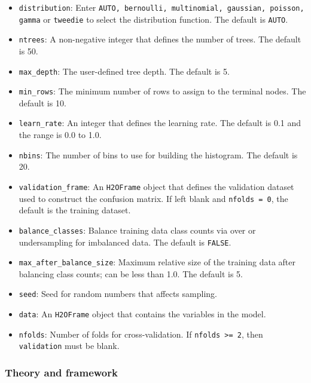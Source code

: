 \documentclass{article}[11pt]
\begin{document}
{\begin{itemize}
\item \texttt{distribution}: Enter {\texttt{AUTO, bernoulli, multinomial, gaussian, poisson, gamma}} or {\texttt{tweedie}} to select the distribution function. The default is {\texttt{AUTO}}. 

\item {\texttt{ntrees}}: A non-negative integer that defines the number of trees. The default is 50. 

\item {\texttt{max\_depth}}: The user-defined tree depth. The default is 5. 

\item {\texttt{min\_rows}}: The minimum number of rows to assign to the terminal nodes. The default is 10. 

\item {\texttt{learn\_rate}}: An integer that defines the learning rate. The default is 0.1 and the range is 0.0 to 1.0. 

\item {\texttt{nbins}}: The number of bins to use for building the histogram. The default is 20. 

\item {\texttt{validation\_frame}}: An {\texttt{H2OFrame}} object that defines the validation dataset used to construct the confusion matrix. If left blank and {\texttt{nfolds = 0}}, the default is the training dataset.

\item {\texttt{balance\_classes}}: Balance training data class counts via over or undersampling for imbalanced data. The default is {\texttt{FALSE}}. 

\item {\texttt{max\_after\_balance\_size}}: Maximum relative size of the training data after balancing class counts; can be less than 1.0.  The default is 5. 

\item {\texttt{seed}}: Seed for random numbers that affects sampling. 

\item {\texttt{data}}: An {\texttt{H2OFrame}} object that contains the variables in the model. 

\item {\texttt{nfolds}}: Number of folds for cross-validation. If {\texttt{nfolds >= 2}}, then {\texttt{validation}} must be blank. 

\end{itemize}

\subsubsection{Theory and framework} 

}
\end{document}
